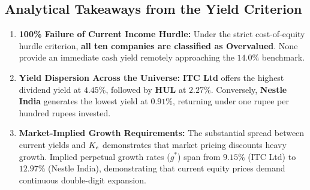 \subsection{Analytical Takeaways from the Yield Criterion}
\begin{enumerate}[label=\textbf{\arabic*.}, topsep=2pt, itemsep=1.5pt, parsep=0pt]
    \item \textbf{100\% Failure of Current Income Hurdle:} Under the strict cost-of-equity hurdle criterion, \textbf{all ten companies are classified as Overvalued}. None provide an immediate cash yield remotely approaching the $14.0\%$ benchmark.
    \item \textbf{Yield Dispersion Across the Universe:} \textbf{ITC Ltd} offers the highest dividend yield at \textbf{$4.45\%$}, followed by \textbf{HUL} at \textbf{$2.27\%$}. Conversely, \textbf{Nestle India} generates the lowest yield at \textbf{$0.91\%$}, returning under one rupee per hundred rupees invested.
    \item \textbf{Market-Implied Growth Requirements:} The substantial spread between current yields and $K_e$ demonstrates that market pricing discounts heavy growth. Implied perpetual growth rates ($g^*$) span from \textbf{$9.15\%$} (ITC Ltd) to \textbf{$12.97\%$} (Nestle India), demonstrating that current equity prices demand continuous double-digit expansion.
\end{enumerate}
